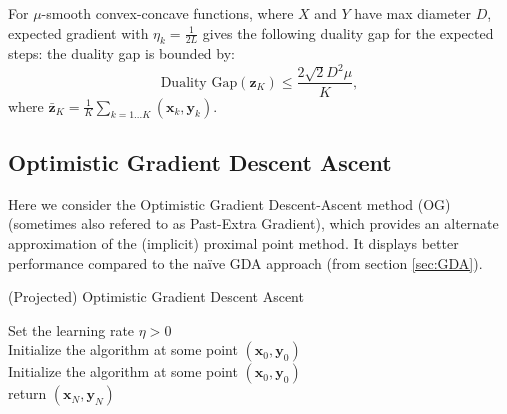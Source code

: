 \begin{proposition}
    \label{prop:proj_eg_smooth_convex_concave_last_it}
    For $\mu$-smooth convex-concave functions, where $X$ and $Y$ have max diameter $D$, expected gradient with $\eta_k = \frac{1}{2L}$ gives the following duality gap for the expected steps:
    the duality gap is bounded by:
    \[
        \text{Duality Gap}({\bm{z}}_K) \leq \frac{2 \sqrt{2} D^2 \mu}{K},
    \]
    where $\bar{\bm{z}}_K = \frac{1}{K} \sum_{k = 1...K} (\bm{x}_k,\bm{y}_k)$.
\end{proposition}





\subsection{Optimistic Gradient Descent Ascent}

Here we consider the Optimistic Gradient Descent-Ascent method (OG) (sometimes also refered to as Past-Extra Gradient), which provides an alternate approximation of the (implicit) proximal point method. It displays better performance compared to the naïve GDA approach (from section \ref{sec:GDA}). 


\begin{algorithm}[H]
    \label{alg:projOG}
    \SetAlgoLined
    \caption{(Projected) Optimistic Gradient Descent Ascent}
    Set the learning rate $\eta >0$ \\
    Initialize the algorithm at some point $(\bm{x}_0,\bm{y}_0)$  \\
    Initialize the algorithm at some point $(\bm{x}_0,\bm{y}_0)$  \\
    return $(\bm{x}_N,\bm{y}_N)$
\end{algorithm}

